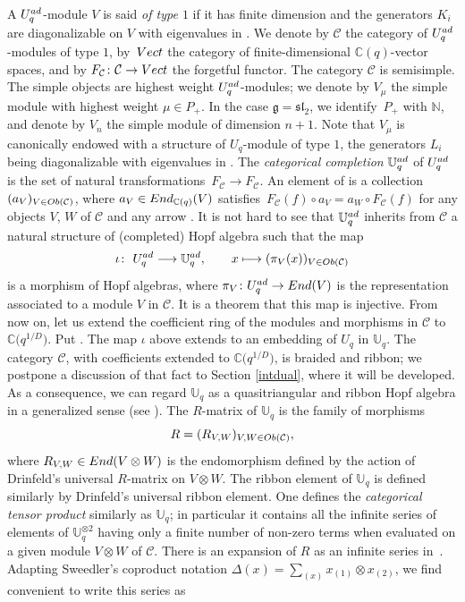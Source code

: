 \documentclass[11pt]{article}
\numberwithin{equation}{section}
\numberwithin{equation}{section}
\theoremstyle{definition}
\newcommand{\mUq}{\mathbb{U}_q}
\newcommand{\mc}{\mathbb{C}}
\newcommand{\mz}{\mathbb{Z}}
\newcommand{\ra}{\rightarrow}
\begin{document}
A $U_q^{\rm ad}$-module $V$ is said {\it of type $1$} if it has finite dimension and the generators $K_i$ are diagonalizable on $V$ with eigenvalues in \smash{$q_i^{\mz}$}. We denote by $\mathcal{C}$ the category of $U_q^{\rm ad}$-modules of type $1$, by~${\rm Vect}$ the category of finite-dimensional $\mc(q)$-vector spaces, and by $F_{\mathcal C}\colon{\mathcal C}\to {\rm Vect}$ the forgetful functor. The category $\mathcal{C}$ is semisimple. The simple objects are highest weight $U_q^{\rm ad}$-modules; we denote by $V_\mu$ the simple module with highest weight $\mu\in P_+$. In the case $\mathfrak{g}={\mathfrak{sl}_2}$, we identify~$P_+$ with $\mathbb{N}$, and denote by $V_n$ the simple module of dimension $n+1$. Note that $V_\mu$ is canonically endowed with a structure of $U_q$-module of type $1$, the generators $L_i$ being diagonalizable with eigenvalues in \smash{$q_i^{\mz/D}$}. The {\it categorical completion} $\mUq^{\rm ad}$ of $U_q^{\rm ad}$ is the set of natural transformations~${F_{\mathcal C}\ra F_{\mathcal C}}$. An element of \smash{$\mUq^{\rm ad}$} is a collection $(a_V)_{V\in {\rm Ob}(\mathcal{C})}$, where $a_V\in {\rm End}_{\mc(q)}(V)$ satisfies~${F_{\mathcal C}(f)\circ a_V=a_W\circ F_{\mathcal C}(f)}$ for any objects $V$, $W$ of $\mathcal{C}$ and any arrow . It is not hard to see that $\mUq^{\rm ad}$ inherits from $\mathcal{C}$ a natural structure of (completed) Hopf algebra such that the map
\begin{gather}\label{defiota}
\iota\colon\ U_q^{\rm ad} \longrightarrow \mUq^{\rm ad}, \qquad x\longmapsto(\pi_V(x))_{V\in {\rm Ob}(\mathcal{C})}
\end{gather}
is a morphism of Hopf algebras, where $\pi_V\colon U_q^{\rm ad} \ra {\rm End}(V)$ is the representation associated to a module $V$ in $\mathcal{C}$. It is a theorem that this map is injective. From now on, let us extend the coefficient ring of the modules and morphisms in $\mathcal{C}$ to $\mc\big(q^{1/D}\big)$. Put \smash{$\mUq = \mUq^{\rm ad} \bigotimes_{\mc(q)} \mc\big(q^{1/D}\big)$}.
The map $\iota$ above extends to an embedding of $U_q$ in $\mUq$. The category $\mathcal{C}$, with coefficients extended to $\mc\big(q^{1/D}\big)$, is braided and ribbon; we postpone a discussion of that fact to Section \ref{intdual}, where it will be developed. As a consequence, we can regard $\mUq$ as a quasitriangular and ribbon Hopf algebra in a generalized sense (see \cite{BR}). The $R$-matrix of $\mUq$ is the family of morphisms
\[R = (R_{V,W})_{V,W\in {\rm Ob}(\mathcal{C})},\]
where $R_{V,W}\in {\rm End}(V\otimes W)$ is the endomorphism defined by the action of Drinfeld's universal $R$-matrix on $V\otimes W$. The ribbon element of $\mUq$ is defined similarly by Drinfeld's universal ribbon element. One defines the {\it categorical tensor product} \smash{$\mUq^{\hat{\otimes} 2}$} similarly as $\mUq$; in particular it contains all the infinite series of elements of $\mUq^{\otimes 2}$ having only a finite number of non-zero terms when evaluated on a given module $V\otimes W$ of $\mathcal{C}$. There is an expansion of $R$ as an infinite series in~\smash{$\mUq^{\hat{\otimes} 2}$}. Adapting Sweedler's coproduct notation $ \Delta(x)=\sum_{(x)}x_{(1)}\otimes x_{(2)}$, we find convenient to write this series as
\end{document}
